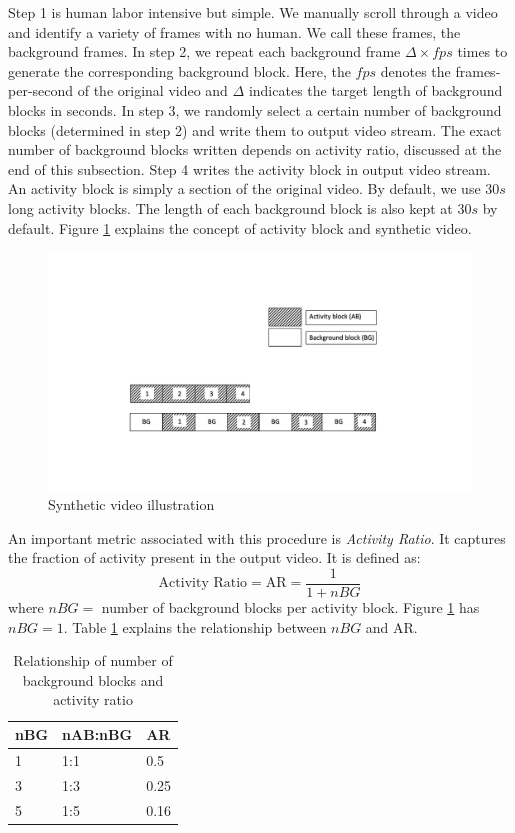 Step 1 is human labor intensive but simple. We manually scroll through a video and identify a variety of frames with no human. We call these frames, the background frames. In step 2, we repeat each background frame $\Delta \times fps$ times to generate the corresponding background block. Here, the $fps$ denotes the frames-per-second of the original video and $\Delta$ indicates the target length of background blocks in seconds. In step 3, we randomly select a certain number of  background blocks (determined in step 2) and write them to output video stream. The exact number of background blocks written depends on activity ratio, discussed at the end of this subsection. Step 4 writes the activity block in output video stream. An activity block is simply a section of the original video. By default, we use $30s$ long activity blocks. The length of each background block is also kept at $30s$ by default. Figure \ref{fig:synthetic-video} explains the concept of activity block and synthetic video.  

\begin{figure}
    \centering
    \includegraphics[width=\linewidth,trim={0 130 0 130},clip]{images/synthetic-video}
    \caption{Synthetic video illustration}
    \label{fig:synthetic-video}
\end{figure}

An important metric associated with this procedure is \textit{Activity Ratio}. It captures the fraction of activity present in the output video. It is defined as: 
$$ \text{Activity Ratio} = \text{AR} = \frac{1}{1+nBG} $$
where $nBG=$ number of background blocks per activity block. Figure \ref{fig:synthetic-video} has $nBG=1$. Table \ref{table:activity-ratio} explains the relationship between $nBG$ and AR. 


\begin{table}
\centering
\caption{Relationship of number of background blocks and activity ratio} \vspace{5pt}
\label{table:activity-ratio}
\begin{tabular}{@{}| l | l | l | @{}} \hline
nBG & nAB:nBG & AR   \\ \hline \hline
1   & 1:1     & 0.5  \\ \hline
3   & 1:3     & 0.25 \\ \hline
5   & 1:5     & 0.16 \\ \hline
\end{tabular}
\end{table}

